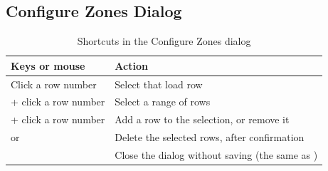 \subsection{Configure Zones Dialog}

\begin{table}[H]
  \centering
  \caption{Shortcuts in the Configure Zones dialog}
  \label{tab:keys-zones}
  \begin{tabularx}{\textwidth}{l L}
    \toprule
    \textbf{Keys or mouse} & \textbf{Action} \\
    \midrule
    Click a row number & Select that load row \\
     + click a row number & Select a range of rows \\
     + click a row number & Add a row to the selection, or remove it \\
     or  & Delete the selected rows, after confirmation \\
     & Close the dialog without saving (the same as ) \\
    \bottomrule
  \end{tabularx}
\end{table}

